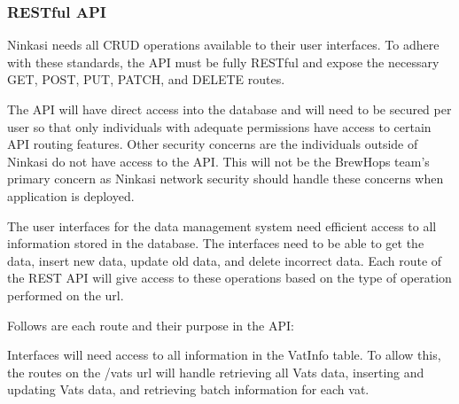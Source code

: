 \documentclass[draftclsnofoot,onecolumn,letterpaper,10pt]{IEEEtran}
\begin{document}
		\subsubsection{RESTful API}

		Ninkasi needs all CRUD operations available to their user interfaces.
		To adhere with these standards, the API must be fully RESTful and expose the necessary GET, POST, PUT, PATCH, and DELETE routes.

		The API will have direct access into the database and will need to be secured per user so that only individuals with adequate permissions have access to certain API routing features.
		Other security concerns are the individuals outside of Ninkasi do not have access to the API.
		This will not be the BrewHops team’s primary concern as Ninkasi network security should handle these concerns when application is deployed.

		The user interfaces for the data management system need efficient access to all information stored in the database.
		The interfaces need to be able to get the data, insert new data, update old data, and delete incorrect data.
		Each route of the REST API will give access to these operations based on the type of operation performed on the url.

		Follows are each route and their purpose in the API:

		Interfaces will need access to all information in the VatInfo table.
		To allow this, the routes on the /vats url will handle retrieving all Vats data, inserting and updating Vats data, and retrieving batch information for each vat.
\end{document}
